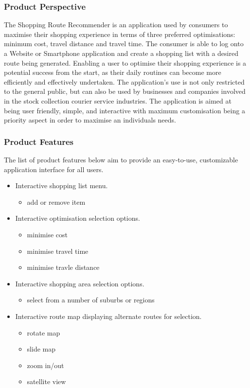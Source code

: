 \documentclass[10pt,twocolumn]{witseiepaper}
\begin{document}
		\subsubsection{Product Perspective}
		
			The Shopping Route Recommender is an application used by consumers to maximise their shopping experience in terms of three preferred optimisations: minimum cost, travel distance and travel time. The consumer is able to log onto a Website or Smartphone application and create a shopping list with a desired route being generated.  Enabling a user to optimise their shopping experience is a potential success from the start, as their daily routines can become more efficiently and effectively undertaken. The application's use is not only restricted to the general public, but can also be used by businesses and companies involved in the stock collection courier service industries. The application is aimed at being user friendly, simple, and interactive with maximum customisation being a priority aspect in order to maximise an individuals needs. 
		
		\subsubsection{Product Features}
		
			The list of product features below aim to provide an easy-to-use, customizable application interface for all users. 
		
			\begin{itemize}
				\item Interactive shopping list menu.
				\begin{itemize}
					\item add or remove item
				\end{itemize}
				\item Interactive optimisation selection options.
				\begin{itemize}
					\item minimise cost
					\item minimise travel time
					\item minimise travle distance
				\end{itemize}
				\item Interactive shopping area selection options.
				\begin{itemize}
					\item select from a number of suburbs or regions
				\end{itemize}
				\item Interactive route map displaying alternate routes for selection.
				\begin{itemize}
					\item rotate map
					\item slide map
					\item zoom in/out
					\item satellite view
				\end{itemize}
			\end{itemize}
		
\end{document}
